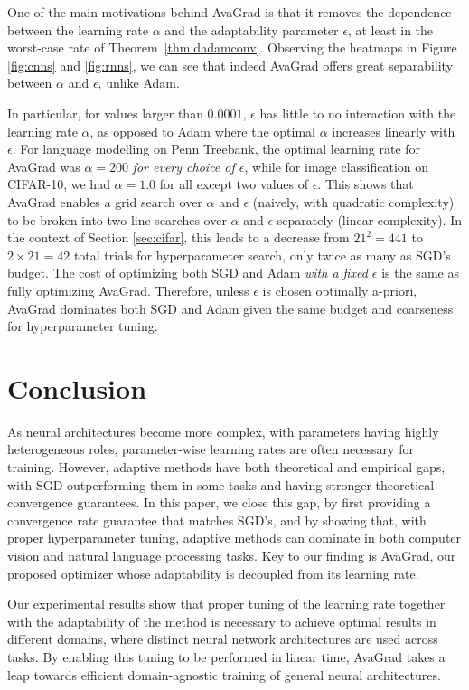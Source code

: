 \documentclass{article}
\newif\ifarxiv
\newcommand{\thmref}[1]{Theorem~\ref{#1}}
\begin{document}
One of the main motivations behind AvaGrad is that it removes the dependence
between the learning rate $\alpha$ and the adaptability parameter $\epsilon$,
at least in the worst-case rate of \thmref{thm:dadamconv}.  Observing the
heatmaps in Figure \ref{fig:cnns} and
\ref{fig:rnns}, we can see that indeed AvaGrad offers great
separability between $\alpha$ and $\epsilon$, unlike Adam. 

In particular, for values larger than $0.0001$, $\epsilon$ has little to no interaction with the
learning rate $\alpha$, as opposed to Adam where the optimal $\alpha$ increases
linearly with $\epsilon$. For language modelling on Penn Treebank, the optimal
learning rate for AvaGrad was $\alpha = 200$ \emph{for every choice of
$\epsilon$}, while for image classification on CIFAR-10, we had $\alpha = 1.0$
for all except two values of $\epsilon$.  This
shows that AvaGrad enables a grid search over $\alpha$ and $\epsilon$ (naively, with
quadratic complexity) to be broken into two line searches over $\alpha$ and
$\epsilon$ separately (linear complexity). In the context of Section \ref{sec:cifar}, this leads to a decrease from $21^2=441$ to $2 \times 21 = 42$ total trials for hyperparameter search, only twice as many as SGD's budget. The cost of optimizing both SGD and Adam \emph{with a fixed $\epsilon$} is the same as fully optimizing AvaGrad. Therefore, unless $\epsilon$ is chosen optimally a-priori, AvaGrad dominates both SGD and Adam given the same budget and coarseness for hyperparameter tuning.




 \section{Conclusion}
\label{sec:conclusion}

As neural architectures become more complex, with parameters having highly
heterogeneous roles, parameter-wise learning rates are often necessary for
training.  However, adaptive methods have both theoretical and empirical gaps,
with SGD outperforming them in some tasks and having stronger theoretical convergence guarantees.  In this paper, we close
this gap, by first providing a convergence rate guarantee that matches SGD's, and by showing that, with proper hyperparameter tuning, adaptive methods can dominate in both computer vision and natural language processing tasks. Key to our finding is AvaGrad, our proposed optimizer whose adaptability is decoupled from its learning rate.

Our experimental results show that proper tuning of the learning rate together with the adaptability of the method is necessary to achieve optimal results in different domains, where distinct neural network architectures are used across tasks. By enabling this tuning to be performed in linear time, AvaGrad takes a leap towards efficient domain-agnostic training of general neural architectures. 

\ifarxiv
   
\else
   
\fi
\end{document}

